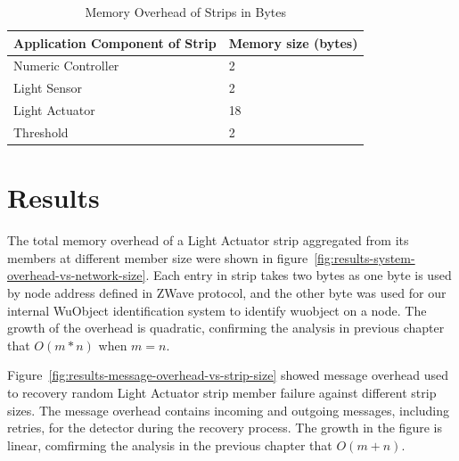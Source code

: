\begin{table}
\centering
\caption{Memory Overhead of Strips in Bytes}
\label{tbl:results-memory-overhead-strip}
  \begin{tabular}{|l|l|}
  \hline
  \textbf{Application Component of Strip} & \textbf{Memory size (bytes)} \\
  \hline
  Numeric Controller & 2 \\
  \hline
  Light Sensor & 2 \\
  \hline
  Light Actuator & 18 \\
  \hline
  Threshold & 2 \\
  \hline
  \end{tabular}
\end{table}







\section{Results}
\label{s:results}

The total memory overhead of a Light Actuator strip aggregated from its members
at different member size were shown in
figure~\ref{fig:results-system-overhead-vs-network-size}. Each entry in strip
takes two bytes as one byte is used by node address defined in ZWave protocol,
and the other byte was used for our internal WuObject identification system to
identify wuobject on a node. The growth of the overhead is quadratic, confirming
the analysis in previous chapter that $O(m*n)$ when $m = n$. 

Figure~\ref{fig:results-message-overhead-vs-strip-size} showed message overhead
used to recovery random Light Actuator strip member failure against different
strip sizes. The message overhead contains incoming and outgoing messages,
including retries, for the detector during the recovery process. The growth in
the figure is linear, comfirming the analysis in the previous chapter that $O(m+n)$.

